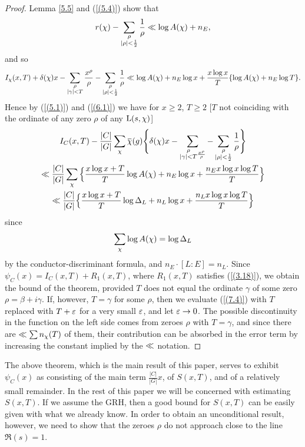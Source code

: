 \documentclass[./main]{subfiles}
\begin{document}
\begin{proof}
Lemma \ref{5.5} and (\ref{(5.4)}) show that 
\[ r(\chi) - \sum_{\substack{\rho \\ |\rho| < \frac{1}{2}}} \frac{1}{\rho} \ll \log A(\chi) + n_E,
\]
and so 
\begin{multline*}I_{\chi}(x,T) + \delta(\chi)x - \sum_{\substack{\rho \\ |\gamma| < T}} \frac{x^\rho}{\rho} - \sum_{\substack{\rho \\ |\rho| < \frac{1}{2}}} \frac{1}{\rho} 
\ll \log A(\chi) + n_E \log x + \frac{x \log x}{T} \{\log A(\chi) + n_E \log T\}.
\end{multline*}
Hence by (\ref{(5.1)}) and (\ref{(6.1)}) we have for $x \geq 2$, $T \geq 2$ [$T$ not coinciding with the ordinate of any zero $\rho$ of any $\operatorname{L}(s, \chi)$]
\begin{multline*}
    I_C(x,T) - \frac{|C|}{|G|} \sum_{\chi} \xoverline{\chi}(g) \Bigg\{\delta(\chi)x - \sum_{\substack{\rho \\ |\gamma| <T} \frac{x^{\rho}}{\rho}} - \sum_{\substack{\rho \\ |\rho| < \frac{1}{2}}} \frac{1}{\rho} \Bigg\} \\
    \Vinogradov \frac{|C|}{|G|} \sum_{\chi} \Big\{\frac{x \log x + T}{T} \log A(\chi) + n_E \log x + \frac{n_E x \log x \log T}{T}\Big\}\\
    \Vinogradov \frac{|C|}{|G|} \Big\{ \frac{x \log x + T}{T} \log \disc_L  + n_L \log x + \frac{n_L x \log x \log T}{T}\Big\}
\end{multline*}
since 
\[ \sum_{\chi} \log A(\chi) = \log \Delta_L 
\]
by the conductor-discriminant formula, and $n_E \cdot [L \colon E] = n_L$. Since \newline$\psi_{C}(x) = I_C(x,T) + R_{1}(x,T)$, where $R_{1}(x,T)$ satisfies (\ref{(3.18)}), we obtain the bound of the theorem, provided $T$ does not equal the ordinate $\gamma$ of some zero $\rho = \beta + i \gamma$. If, however, $T = \gamma$ for some $\rho$, then we evaluate (\ref{(7.4)}) with $T$ replaced with $T + \varepsilon$ for a very small $\varepsilon$, and let $\varepsilon \to 0$. The possible discontinuity in the function on the left side comes from zeroes $\rho$ with $T = \gamma$, and since there are $\ll \sum n_{\chi}(T)$ of them, their contribution can be absorbed in the error term by increasing the constant implied by the $\ll$ notation.  
\end{proof}
The above theorem, which is the main result of this paper, serves to exhibit $\psi_{C}(x)$ as consisting of the main term $\frac{|C|}{|G|}x$, of $S(x,T)$, and of a relatively small remainder. In the rest of this paper we will be concerned with estimating $S(x,T)$. If we assume the GRH, then a good bound for $S(x,T)$ can be easily given with what we already know. In order to obtain an unconditional result, however, we need to show that the zeroes $\rho$ do not approach close to the line $\Re(s) = 1$.
\end{document}
